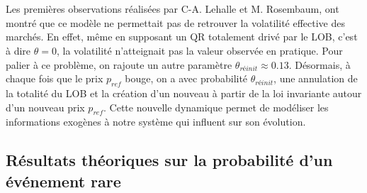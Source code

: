 \documentclass[12pt,a4paper]{article}
\theoremstyle{definition}
\theoremstyle{remark}
\begin{document}
\\
\\
Les premières observations réalisées par C-A. Lehalle et M. Rosembaum, ont montré que ce modèle ne permettait pas de retrouver la volatilité effective des marchés. En effet, même en supposant un QR totalement drivé par le LOB, c'est à dire $\theta=0$, la volatilité n'atteignait pas la valeur observée en pratique. Pour palier à ce problème, on rajoute un autre paramètre $\theta_{réinit}\approx0.13$. Désormais, à chaque fois que le prix $p_{ref}$ bouge, on a avec probabilité $\theta_{réinit}$, une annulation de la totalité du LOB et la création d'un nouveau à partir de la loi invariante autour d'un nouveau prix $p_{ref}$. Cette nouvelle dynamique permet de modéliser les informations exogènes à notre système qui influent sur son évolution.




\subsection{Résultats théoriques sur la probabilité d'un événement rare}
\end{document}
